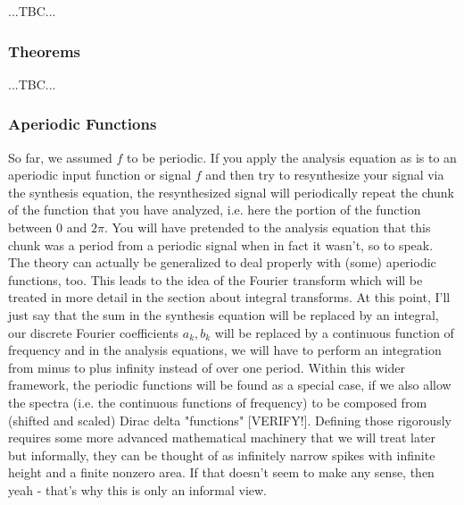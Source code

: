 ...TBC...

\subsubsection{Theorems}
...TBC...


\subsubsection{Aperiodic Functions}
So far, we assumed $f$ to be periodic. If you apply the analysis equation as is to an aperiodic input function or signal $f$ and then try to resynthesize your signal via the synthesis equation, the resynthesized signal will periodically repeat the chunk of the function that you have analyzed, i.e. here the portion of the function between $0$ and $2 \pi$. You will have pretended to the analysis equation that this chunk was a period from a periodic signal when in fact it wasn't, so to speak. The theory can actually be generalized to deal properly with (some) aperiodic functions, too. This leads to the idea of the Fourier transform which will be treated in more detail in the section about integral transforms. At this point, I'll just say that the sum in the synthesis equation will be replaced by an integral, our discrete Fourier coefficients $a_k, b_k$ will be replaced by a continuous function of frequency and in the analysis equations, we will have to perform an integration from minus to plus infinity instead of over one period. Within this wider framework, the periodic functions will be found as a special case, if we also allow the spectra (i.e. the continuous functions of frequency) to be composed from (shifted and scaled) Dirac delta "functions" [VERIFY!]. Defining those rigorously requires some more advanced mathematical machinery that we will treat later but informally, they can be thought of as infinitely narrow spikes with infinite height and a finite nonzero area. If that doesn't seem to make any sense, then yeah - that's why this is only an informal view.




